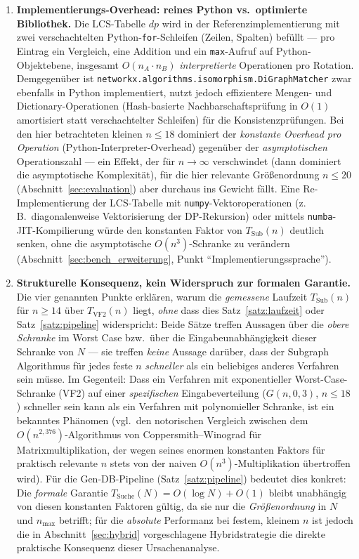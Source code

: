 \documentclass[a4paper,12pt, twoside]{report}
\theoremstyle{definition}
\begin{document}
\begin{enumerate}
	\item \textbf{Implementierungs-Overhead: reines Python vs.\ optimierte Bibliothek.} Die LCS-Tabelle $dp$ wird in der Referenzimplementierung mit zwei verschachtelten Python-\texttt{for}-Schleifen (Zeilen, Spalten) befüllt — pro Eintrag ein Vergleich, eine Addition und ein \texttt{max}-Aufruf auf Python-Objektebene, insgesamt $O(n_A\cdot n_B)$ \emph{interpretierte} Operationen pro Rotation. Demgegenüber ist \texttt{networkx.algorithms.isomorphism.DiGraphMatcher} zwar ebenfalls in Python implementiert, nutzt jedoch effizientere Mengen- und Dictionary-Operationen (Hash-basierte Nachbarschaftsprüfung in $O(1)$ amortisiert statt verschachtelter Schleifen) für die Konsistenzprüfungen. Bei den hier betrachteten kleinen $n\le 18$ dominiert der \emph{konstante Overhead pro Operation} (Python-Interpreter-Overhead) gegenüber der \emph{asymptotischen} Operation\-szahl — ein Effekt, der für $n\to\infty$ verschwindet (dann dominiert die asymptotische Komplexität), für die hier relevante Größenordnung $n\le 20$ (Abschnitt~\ref{sec:evaluation}) aber durchaus ins Gewicht fällt. Eine Re-Implementierung der LCS-Tabelle mit \texttt{numpy}-Vektoroperationen (z.\,B.\ diagonalenweise Vektorisierung der DP-Rekursion) oder mittels \texttt{numba}-JIT-Kompilierung würde den konstanten Faktor von $T_{\text{Sub}}(n)$ deutlich senken, ohne die asymptotische $O(n^3)$-Schranke zu verändern (Abschnitt~\ref{sec:bench_erweiterung}, Punkt ``Implementierungssprache'').

	\item \textbf{Strukturelle Konsequenz, kein Widerspruch zur formalen Garantie.} Die vier genannten Punkte erklären, warum die \emph{gemessene} Laufzeit $T_{\text{Sub}}(n)$ für $n\ge 14$ über $T_{\text{VF2}}(n)$ liegt, \emph{ohne} dass dies Satz~\ref{satz:laufzeit} oder Satz~\ref{satz:pipeline} widerspricht: Beide Sätze treffen Aussagen über die \emph{obere Schranke} im Worst Case bzw.\ über die Eingabeunabhängigkeit dieser Schranke von $N$ — sie treffen \emph{keine} Aussage darüber, dass der Subgraph Algorithmus für jedes feste $n$ \emph{schneller} als ein beliebiges anderes Verfahren sein müsse. Im Gegenteil: Dass ein Verfahren mit exponentieller Worst-Case-Schranke (VF2) auf einer \emph{spezifischen} Eingabeverteilung ($G(n,0{,}3)$, $n\le 18$) schneller sein kann als ein Verfahren mit polynomieller Schranke, ist ein bekanntes Phänomen (vgl.\ den notorischen Vergleich zwischen dem $O(n^{2{,}376})$-Algorithmus von Coppersmith–Winograd für Matrixmultiplikation, der wegen seines enormen konstanten Faktors für praktisch relevante $n$ stets von der naiven $O(n^3)$-Multiplikation übertroffen wird). Für die Gen-DB-Pipeline (Satz~\ref{satz:pipeline}) bedeutet dies konkret: Die \emph{formale} Garantie $T_{\text{Suche}}(N)=O(\log N)+O(1)$ bleibt unabhängig von diesen konstanten Faktoren gültig, da sie nur die \emph{Größenordnung} in $N$ und $n_{\max}$ betrifft; für die \emph{absolute} Performanz bei festem, kleinem $n$ ist jedoch die in Abschnitt~\ref{sec:hybrid} vorgeschlagene Hybridstrategie die direkte praktische Konsequenz dieser Ursachenanalyse.
\end{enumerate}
\end{document}
